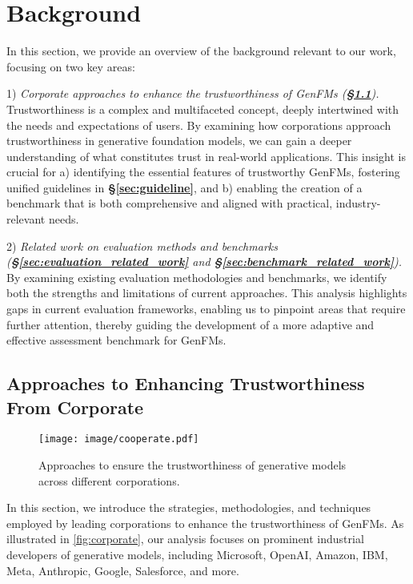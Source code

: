 \clearpage
\section{Background}

In this section, we provide an overview of the background relevant to our work, focusing on two key areas: 

1) \textit{Corporate approaches to enhance the trustworthiness of GenFMs (\textbf{\S\ref{sec:approaches_corporate}}).} Trustworthiness is a complex and multifaceted concept, deeply intertwined with the needs and expectations of users. By examining how corporations approach trustworthiness in generative foundation models, we can gain a deeper understanding of what constitutes trust in real-world applications. This insight is crucial for a) identifying the essential features of trustworthy GenFMs, fostering unified guidelines in \textbf{\S\ref{sec:guideline}}, and b) enabling the creation of a benchmark that is both comprehensive and aligned with practical, industry-relevant needs. 

2) \textit{Related work on evaluation methods and benchmarks (\textbf{\S\ref{sec:evaluation_related_work}} and \textbf{\S\ref{sec:benchmark_related_work}}).} By examining existing evaluation methodologies and benchmarks, we identify both the strengths and limitations of current approaches. This analysis highlights gaps in current evaluation frameworks, enabling us to pinpoint areas that require further attention, thereby guiding the development of a more adaptive and effective assessment benchmark for GenFMs.



\subsection{Approaches to Enhancing Trustworthiness From Corporate}
\label{sec:approaches_corporate}



\begin{figure}[h]
    \centering
    \texttt{[image: image/cooperate.pdf]}
    \caption{Approaches to ensure the trustworthiness of generative models across different corporations.}
    \label{fig:corporate}
    \vspace{-2pt}
\end{figure}

In this section, we introduce the strategies, methodologies, and techniques employed by leading corporations to enhance the trustworthiness of GenFMs. As illustrated in \autoref{fig:corporate}, our analysis focuses on prominent industrial developers of generative models, including Microsoft, OpenAI, Amazon, IBM, Meta, Anthropic, Google, Salesforce, and more.



